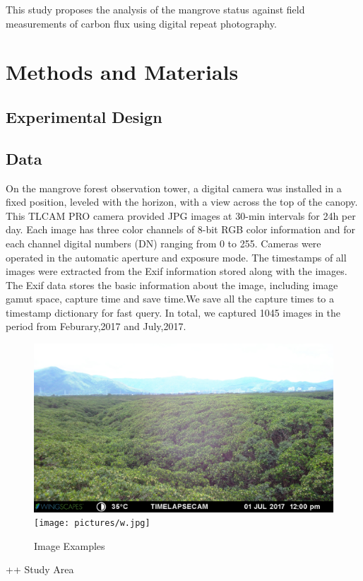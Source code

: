 \documentclass{article}
\begin{document}
This study proposes the analysis of the mangrove status against field measurements
of carbon flux using digital repeat photography.


\section{Methods and Materials}
\label{sec:headings}

\subsection{Experimental Design}


\subsection{Data}
On the mangrove forest observation tower, a digital camera was installed in a fixed position, leveled with the horizon, with a view across the top of the canopy. This TLCAM PRO camera provided JPG images at 30-min intervals for 24h per day. Each image has three color channels of 8-bit RGB color information and for each channel digital numbers (DN) ranging from 0 to 255. Cameras were operated in the automatic aperture and exposure mode. The timestamps of all images were extracted from the Exif information stored along with the images. The Exif data stores the basic information about the image, including image gamut space, capture time and save time.We save all the capture times to a timestamp dictionary for fast query. In total, we captured 1045 images in the period from Feburary,2017 and July,2017. { \color{red}{Figure 1 shows two image examples and the extracted timestamps.}}

\begin{figure}
  \centering
  \includegraphics[width=1\textwidth]{pictures/WSCT4349.jpg}
  \texttt{[image: pictures/w.jpg]}
  \caption{Image Examples}
  \label{fig:fig1}
\end{figure}
++ Study Area
\end{document}
